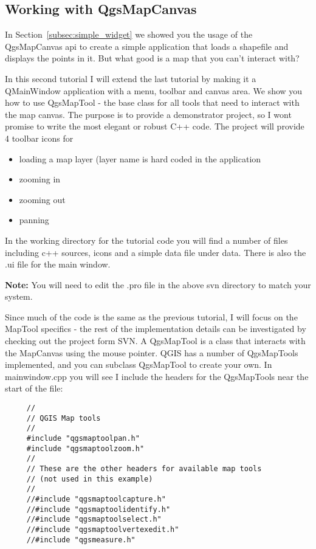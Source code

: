 \subsection{Working with QgsMapCanvas}

In Section~\ref{subsec:simple_widget} we showed you the usage of the
QgsMapCanvas api to create a simple application that loads a shapefile and
displays the points in it. But what good is a map that you can't interact
with? 

In this second tutorial I will extend the last tutorial by making it a
QMainWindow application with a menu, toolbar and canvas area. We show you how
to use QgsMapTool - the base class for all tools that need to interact with
the map canvas.
The purpose is to provide a demonstrator project, so I wont promise to write the most
elegant or robust C++ code. The project will provide 4 toolbar icons for

\begin{itemize}
 \item loading a map layer (layer name is hard coded in the application
 \item zooming in
 \item zooming out
 \item panning
\end{itemize}

In the working directory for the tutorial code you will find a number of files
including c++ sources, icons and a simple data file under data. There is also
the .ui file for the main window.

\textbf{Note:} You will need to edit the .pro file in the above svn directory to
match your system.

Since much of the code is the same as the previous tutorial, I will focus on
the MapTool specifics - the rest of the implementation details can be
investigated by checking out the project form SVN. A QgsMapTool is a class that
interacts with the MapCanvas using the mouse pointer. QGIS has a number of
QgsMapTools implemented, and you can subclass QgsMapTool to create your own. In
mainwindow.cpp you will see I include the headers for the QgsMapTools near the
start of the file:

\begin{verbatim}
     //
     // QGIS Map tools
     //
     #include "qgsmaptoolpan.h"
     #include "qgsmaptoolzoom.h"
     //
     // These are the other headers for available map tools 
     // (not used in this example)
     //
     //#include "qgsmaptoolcapture.h"
     //#include "qgsmaptoolidentify.h"
     //#include "qgsmaptoolselect.h"
     //#include "qgsmaptoolvertexedit.h"
     //#include "qgsmeasure.h"
\end{verbatim}

